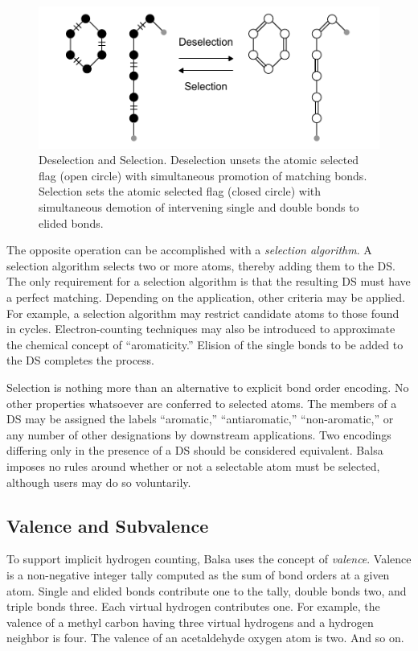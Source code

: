 \documentclass{article}
\begin{document}
\begin{figure}
    \centering
    \includegraphics[width=\columnwidth]{selection-and-deselection.pdf}
    \caption{Deselection and Selection. Deselection unsets the atomic selected flag (open circle) with simultaneous promotion of matching bonds. Selection sets the atomic selected flag (closed circle) with simultaneous demotion of intervening single and double bonds to elided bonds.}
    \label{fig:selection-and-deselection}
\end{figure}

The opposite operation can be accomplished with a \textit{selection algorithm}. A selection algorithm selects two or more atoms, thereby adding them to the DS. The only requirement for a selection algorithm is that the resulting DS must have a perfect matching. Depending on the application, other criteria may be applied. For example, a selection algorithm may restrict candidate atoms to those found in cycles. Electron-counting techniques may also be introduced to approximate the chemical concept of \enquote{aromaticity.} Elision of the single bonds to be added to the DS completes the process.

Selection is nothing more than an alternative to explicit bond order encoding. No other properties whatsoever are conferred to selected atoms. The members of a DS may be assigned the labels \enquote{aromatic,} \enquote{antiaromatic,} \enquote{non-aromatic,} or any number of other designations by downstream applications. Two encodings differing only in the presence of a DS should be considered equivalent. Balsa imposes no rules around whether or not a selectable atom must be selected, although users may do so voluntarily.

\subsection*{Valence and Subvalence}
\label{valence-and-subvalence}

To support implicit hydrogen counting, Balsa uses the concept of \textit{valence}. Valence is a non-negative integer tally computed as the sum of bond orders at a given atom. Single and elided bonds contribute one to the tally, double bonds two, and triple bonds three. Each virtual hydrogen contributes one. For example, the valence of a methyl carbon having three virtual hydrogens and a hydrogen neighbor is four. The valence of an acetaldehyde oxygen atom is two. And so on.
\end{document}

